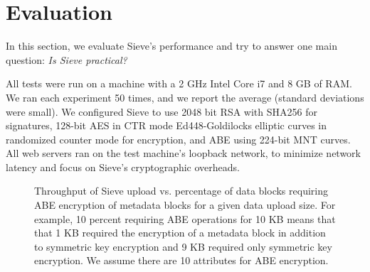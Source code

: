 \chapter{Evaluation}
\label{sec:evaluation}

In this section, we evaluate Sieve's performance
and try to answer one main question: \textit{Is Sieve practical?}

All tests were run on a machine with a 2 GHz
Intel Core i7 and 8 GB of RAM. 
We ran each experiment 50 times, and we report
the average (standard deviations were small).
We configured Sieve to use 2048 bit RSA with
SHA256 for signatures, 128-bit AES in CTR mode
Ed448-Goldilocks elliptic curves in randomized
counter mode for encryption, and ABE using 224-bit MNT curves. 
All web servers ran on the test machine's loopback
network, to minimize network latency and
focus on Sieve's cryptographic overheads.

\begin{figure}[t!]
\centering
    \caption{Throughput of Sieve upload vs. percentage of data blocks
requiring ABE encryption of metadata blocks for a given data upload size. For example,
10 percent requiring ABE operations for 10 KB means that that 1 KB
required the encryption of a metadata
block in addition to symmetric key encryption and 9 KB 
required only symmetric key encryption. We assume there
are 10 attributes for ABE encryption.}
\label{fig:throughput}
\end{figure}

